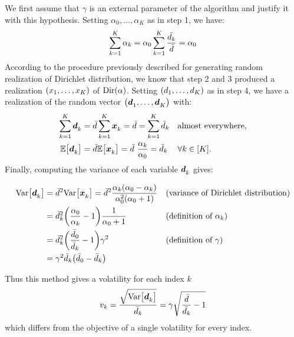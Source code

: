 We first assume that $\gamma$ is an external parameter of the algorithm and justify it with this hypothesis. Setting $\alpha_0,\ldots,\alpha_K$ as in step 1, we have:
\begin{equation}
  \sum_{k=1}^K \alpha_k = \alpha_0 \sum_{k=1}^K\frac{\bar{d_k}}{\bar{d}} = \alpha_0
\end{equation}
According to the procedure previously described for generating random realization of Dirichlet distribution, we know that step 2 and 3 produced a realization $\bracket{x_1,\ldots,x_K}$ of $\Dir\bracket{\alpha}$. Setting $\bracket{\demand_1,\ldots,\demand_K}$ as in step 4, we have a realization of the random vector $\bracket{\va\demand_1,\ldots,\va\demand_K}$ with:
\begin{align}
  \sum_{k=1}^K \va\demand_k
  &= \bar{\demand} \sum_{k=1}^K \va x_k
  = \bar{\demand}
  = \sum_{k=1}^K \bar{\demand}_k
  && \mbox{almost everywhere},
  \\
  \espe\sqbracket{\va\demand_k}
  &= \bar{\demand}\espe\sqbracket{\va x_k}
  = \bar{\demand}\ \frac{\alpha_k}{\alpha_0}
  = \bar{\demand}_k
  && \forall k\in\range{K}.
\end{align}
Finally, computing the variance of each variable $\va\demand_k$ gives:

\begin{subequations}
\begin{align}
  \vari\sqbracket{\va\demand_k}
  &= \bar{\demand}^2\vari\sqbracket{\va x_k}
  = \bar{\demand}^2
  \frac{\alpha_k\bracket{\alpha_0-\alpha_k}}{\alpha_0^2\bracket{\alpha_0+1}}
  && \mbox{(variance of Dirichlet distribution)}
  \\
  &= \bar{\demand}_k^2 \bracket{\frac{\alpha_0}{\alpha_k}-1}\frac{1}{\alpha_0+1}
  && \mbox{(definition of $\alpha_k$)}
  \\
  &= \bar{\demand}_k^2 \bracket{\frac{\bar{\demand}_0}{\bar{\demand}_k}-1}\gamma^2
  && \mbox{(definition of $\gamma$)}
  \\
  &= \gamma^2 \bar{\demand}_k \bracket{\bar{\demand}_0-\bar{\demand}_k}
\end{align}
\end{subequations}

Thus this method gives a volatility for each index $k$
\begin{equation}
  v_k
  = \frac{\sqrt{\vari\sqbracket{\va\demand_k}}}{\bar{\demand}_k}
  = \gamma\sqrt{\frac{\bar{\demand}}{\bar{\demand_k}}-1}
\end{equation}
which differs from the objective of a single volatility for every index.

